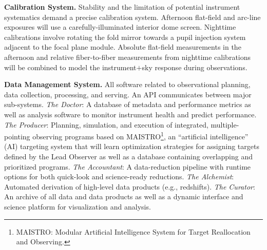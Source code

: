 \documentclass[oneside,11pt]{amsart}
\begin{document}
\noindent \textbf{Calibration System.} Stability and the limitation of potential instrument systematics demand a
precise calibration system.  Afternoon flat-field and arc-line exposures will use a carefully-illuminated interior dome
screen.  Nighttime calibrations involve rotating the fold mirror towards a pupil injection system adjacent to the focal
plane module.  Absolute flat-field measurements in the afternoon and relative fiber-to-fiber measurements from
nighttime calibrations will be combined to model the instrument$+$sky response during observations.

\noindent \textbf{Data Management System.} All software related to observational planning, data collection, processing, and serving.  An API communicates between major sub-systems.  \emph{The Doctor}: A database of metadata and performance metrics as well as analysis software to monitor instrument health and predict performance.  \emph{The Producer}: Planning, simulation, and execution of integrated, multiple-pointing observing programs based on MAISTRO\footnote{MAISTRO: Modular
Artificial Intelligence System for Target Reallocation and Observing.}, an ``artificial intelligence'' (AI) targeting
system that will learn optimization strategies for assigning targets defined by the Lead Observer as well as a database
containing overlapping and prioritized programs.  \emph{The Accountant}: A data-reduction pipeline with runtime options
for both quick-look and science-ready reductions. \emph{The Alchemist}: Automated derivation of high-level data products (e.g.,
redshifts). \emph{The Curator}: An archive of all data and data products as well as a dynamic interface and
science platform for visualization and analysis.

\end{document}
